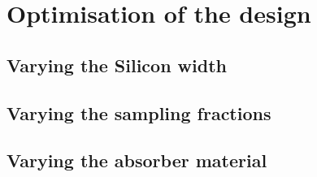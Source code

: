 \section{Optimisation of the design}
\label{sec:optim}

\subsection{Varying the Silicon width}

\subsection{Varying the sampling fractions}

\subsection{Varying the absorber material}

